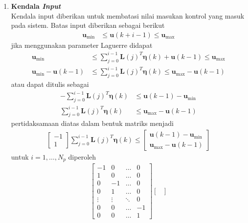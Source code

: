 \begin{enumerate}
    \item \textbf{Kendala \textit{Input}} \\
    Kendala input diberikan untuk membatasi nilai masukan kontrol yang masuk pada sistem. Batas input diberikan sebagai berikut
    \begin{align*}
        \pmb{u}_{\min} &\leq \pmb{u}(k+i-1) \leq \pmb{u}_{\max} 
    \end{align*}
    jika menggunakan parameter Laguerre didapat
    \begin{align*}
        \pmb{u}_{\min} &\leq \sum_{j=0}^{i-1}\pmb{L}(j)^T\pmb{\eta}(k)+\pmb{u}(k-1) \leq \pmb{u}_{\max} \\
        \pmb{u}_{\min}-\pmb{u}(k-1) &\leq \sum_{j=0}^{i-1}\pmb{L}(j)^T\pmb{\eta}(k) \leq \pmb{u}_{\max}-\pmb{u}(k-1)
    \end{align*}
    atau dapat ditulis sebagai 
    \begin{align*}
        -\sum_{j=0}^{i-1}\pmb{L}(j)^T\pmb{\eta}(k) &\leq \pmb{u}(k-1)-\pmb{u}_{\min} \\
        \sum_{j=0}^{i-1}\pmb{L}(j)^T\pmb{\eta}(k) &\leq \pmb{u}_{\max}-\pmb{u}(k-1)
    \end{align*}
    pertidaksamaan diatas dalam bentuk matriks menjadi
    \begin{align*}
        \begin{bmatrix}
            -1 \\ 1
        \end{bmatrix} \sum_{j=0}^{i-1}\pmb{L}(j)^T\pmb{\eta}(k) \leq \begin{bmatrix}
            \pmb{u}(k-1)-\pmb{u}_{\min} \\ \pmb{u}_{\max}-\pmb{u}(k-1)
        \end{bmatrix}
    \end{align*}
    untuk $i=1,\hdots,N_p$ diperoleh
    \begin{align*}
        \begin{bmatrix}
            -1 & 0 & \hdots & 0 \\ 
            1 & 0 & \hdots & 0 \\
            0 & -1 & \hdots & 0 \\
            0 & 1 & \hdots & 0 \\
            \vdots & \vdots & \ddots & 0\\
            0 & 0 & \hdots & -1 \\
            0 & 0 & \hdots & 1 
        \end{bmatrix} \begin{bmatrix}

\end{bmatrix}
\end{align*}
\end{enumerate}
